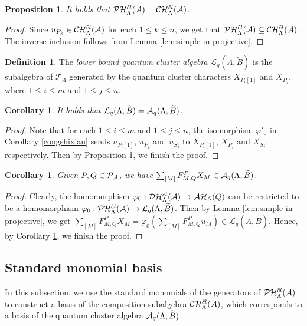 \documentclass[reqno,12pt]{amsart}
\numberwithin{equation}{section}
\theoremstyle{plain} %
\newtheorem{corollary}[theorem]{\bf Corollary}
\newtheorem{proposition}[theorem]{\bf Proposition}
\theoremstyle{definition} %
\newtheorem{definition}[theorem]{\bf Definition}
\begin{document}
\begin{proposition}\label{hlbxd}
It holds that  $\mathcal {P}\mathcal {H}_\Lambda^{{\tilde{c}l}}({\mathcal{A}})=\mathcal {C}\mathcal {H}_\Lambda^{{\tilde{c}l}}({\mathcal{A}})$.
\end{proposition}
\begin{proof}
    Since $u_{P_k}\in \mathcal {C}\mathcal {H}_\Lambda^{{\tilde{c}l}}({\mathcal{A}})$ for each $1\leq k\leq n$, we get that $\mathcal {P}\mathcal {H}_\Lambda^{{\tilde{c}l}}({\mathcal{A}})\subseteq \mathcal {C}\mathcal {H}_\Lambda^{{\tilde{c}l}}({\mathcal{A}})$. The inverse inclusion follows from Lemma \ref{lem:simple-in-projective}.
\end{proof}
\begin{definition}
The {\em lower bound quantum cluster algebra} $\mathcal {L}_q(\Lambda,\widetilde{B})$ is the subalgebra of $\mathcal{T}_\Lambda$ generated by the quantum cluster characters $X_{P_i[1]}$ and $X_{P_j}$, where $1\leq i\leq m$ and $1\leq j\leq n$.
\end{definition}
\begin{corollary}\label{tuil5.6}
It holds that  $\mathcal {L}_q(\Lambda,\widetilde{B})=\mathcal{A}_q(\Lambda,\widetilde{B})$.
\end{corollary}
\begin{proof}
Note that for each $1\leq i\leq m$ and $1\leq j\leq n$, the isomorphism $\varphi'_0$ in Corollary \ref{congshixian} sends $u_{P_i[1]}$, $u_{P_j}$ and $u_{S_j}$ to $X_{P_i[1]}$, $X_{P_j}$ and $X_{S_j}$, respectively. Then by Proposition \ref{hlbxd}, we finish the proof.
\end{proof}
\begin{corollary}
Given $P, Q\in\mathcal {P}_{\mathcal{A}}$, we have $\sum_{[M]}F_{M,Q}^{P}X_M\in \mathcal{A}_q(\Lambda,\widetilde{B})$.
\end{corollary}
\begin{proof}
Clearly, the homomorphism $\varphi_0:\mathcal {D}\mathcal {H}_\Lambda^{{\tilde{c}l}}({\mathcal{A}})\to \mathcal{A}\mathcal{H}_\Lambda(Q)$ can be restricted to be a homomorphism $\varphi_0:\mathcal {P}\mathcal {H}_\Lambda^{{\tilde{c}l}}({\mathcal{A}})\to \mathcal {L}_q(\Lambda,\widetilde{B})$. Then by Lemma \ref{lem:simple-in-projective}, we get $\sum_{[M]}F_{M,Q}^{P}X_M=\varphi_0(\sum_{[M]}F_{M,Q}^{P}u_M)\in\mathcal {L}_q(\Lambda,\widetilde{B})$. Hence, by Corollary \ref{tuil5.6}, we finish the proof.
\end{proof}

\subsection{Standard monomial basis}
In this subsection, we use the standard monomials of the generators of $\mathcal {P}\mathcal {H}_\Lambda^{{\tilde{c}l}}({\mathcal{A}})$ to construct a basis of the composition subalgebra $\mathcal {C}\mathcal {H}_\Lambda^{{\tilde{c}l}}({\mathcal{A}})$, which corresponds to a basis of the quantum cluster algebra $\mathcal{A}_q(\Lambda,\widetilde{B})$.
\end{document}
